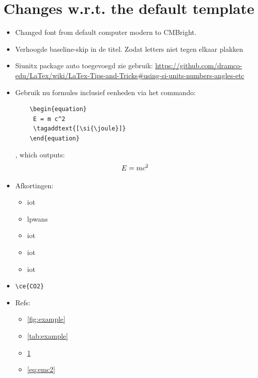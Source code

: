 

\chapter{Changes w.r.t. the default template}\label{ch:introduction}



\begin{itemize}
    \item Changed font from default computer modern to CMBright.
    \item Verhoogde baseline-skip in de titel. Zodat letters niet tegen elkaar plakken
    \item Siunitx package auto toegevoegd zie gebruik: \url{https://github.com/dramco-edu/LaTex/wiki/LaTex-Tips-and-Tricks#using-si-units-numbers-angles-etc}
    \item Gebruik nu formules inclusief eenheden via het commando:
    \begin{lstlisting}
    \begin{equation}
     E = m c^2
     \tagaddtext{[\si{\joule}]}
    \end{equation}
    \end{lstlisting},
    which outputs: 
    \begin{equation}\label{eq:emc2}
     E = m c^2%
     \tagaddtext{[\si{\joule}]}
    \end{equation}
    \item Afkortingen:
    \begin{itemize}
        \item  \gls{iot}      %
   \item \glspl{lpwan}  %
   \item \acrlong{iot}  %
   \item \acrshort{iot} %
   \item \acrfull{iot}  %
    \end{itemize} 
    \item \verb!\ce{CO2}! 
    \item Refs:
        \begin{itemize}
        
         \item \cref{fig:example}
        \item \cref{tab:example}
        \item \cref{ch:introduction}
        \item \cref{eq:emc2}
        

\end{itemize}
\end{itemize}
